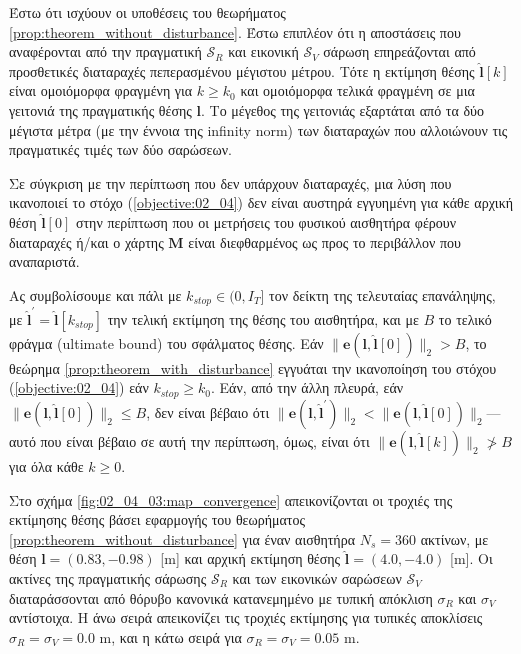 \begin{bw_box}
\begin{theorem}
  \label{prop:theorem_with_disturbance}
  Έστω ότι ισχύουν οι υποθέσεις του θεωρήματος
  \ref{prop:theorem_without_disturbance}. Έστω επιπλέον ότι η αποστάσεις που
  αναφέρονται από την πραγματική $\mathcal{S}_R$ και εικονική $\mathcal{S}_V$
  σάρωση επηρεάζονται από προσθετικές διαταραχές πεπερασμένου μέγιστου μέτρου.
  Τότε η εκτίμηση θέσης $\hat{\bm{l}}[k]$ είναι ομοιόμορφα φραγμένη για $k \geq
  k_0$ και ομοιόμορφα τελικά φραγμένη σε μια γειτονιά της πραγματικής θέσης
  $\bm{l}$. Το μέγεθος της γειτονιάς εξαρτάται από τα δύο μέγιστα μέτρα
  (με την έννοια της infinity norm) των διαταραχών που αλλοιώνουν τις
  πραγματικές τιμές των δύο σαρώσεων.
\end{theorem}
\end{bw_box}

\begin{corollary}
  Σε σύγκριση με την περίπτωση που δεν υπάρχουν διαταραχές, μια λύση που
  ικανοποιεί το στόχο (\ref{objective:02_04}) δεν είναι αυστηρά εγγυημένη για
  κάθε αρχική θέση $\hat{\bm{l}}[0]$ στην περίπτωση που οι μετρήσεις του φυσικού
  αισθητήρα φέρουν διαταραχές ή/και ο χάρτης $\bm{M}$ είναι διεφθαρμένος ως προς
  το περιβάλλον που αναπαριστά.
\end{corollary}

Ας συμβολίσουμε και πάλι με $k_{stop} \in (0, I_T]$ τον δείκτη της τελευταίας
επανάληψης, με $\hat{\bm{l}}^{\prime} = \hat{\bm{l}}[k_{stop}]$ την τελική
εκτίμηση της θέσης του αισθητήρα, και με $B$ το τελικό φράγμα (ultimate bound)
του σφάλματος θέσης. Εάν $\|\bm{e}(\bm{l}, \hat{\bm{l}}[0])\|_2 > B$, το
θεώρημα \ref{prop:theorem_with_disturbance} εγγυάται την ικανοποίηση του στόχου
(\ref{objective:02_04}) εάν $k_{stop} \geq k_0$. Εάν, από την άλλη πλευρά, εάν
$\|\bm{e}(\bm{l}, \hat{\bm{l}}[0])\|_2 \leq B$, δεν είναι βέβαιο ότι
$\|\bm{e}(\bm{l}, \hat{\bm{l}}^{\prime})\|_2 < \|\bm{e}(\bm{l},
\hat{\bm{l}}[0])\|_2$---αυτό που είναι βέβαιο σε αυτή την περίπτωση, όμως,
είναι ότι $\|\bm{e}(\bm{l}, \hat{\bm{l}}[k])\|_2 \ngtr B$ για όλα κάθε $k \geq
0$.

Στο σχήμα \ref{fig:02_04_03:map_convergence} απεικονίζονται οι τροχιές της
εκτίμησης θέσης βάσει εφαρμογής του θεωρήματος
\ref{prop:theorem_without_disturbance} για έναν αισθητήρα $N_s = 360$ ακτίνων,
με θέση $\bm{l} = (0.83, -0.98)$ [m] και αρχική εκτίμηση θέσης $\hat{\bm{l}} =
(4.0,-4.0)$ [m]. Οι ακτίνες της πραγματικής σάρωσης $\mathcal{S}_R$ και των
εικονικών σαρώσεων $\mathcal{S}_V$ διαταράσσονται από θόρυβο κανονικά
κατανεμημένο με τυπική απόκλιση $\sigma_R$ και $\sigma_V$ αντίστοιχα. Η άνω
σειρά απεικονίζει τις τροχιές εκτίμησης για τυπικές αποκλίσεις $\sigma_R =
\sigma_V = 0.0$ m, και η κάτω σειρά για $\sigma_R = \sigma_V = 0.05$ m.

